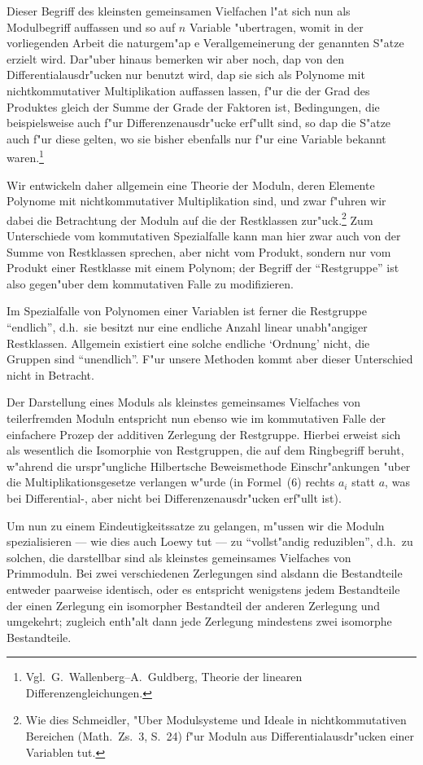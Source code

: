 \documentclass[12pt,a4paper]{article}
\begin{document}
Dieser Begriff des kleinsten gemeinsamen Vielfachen l"at sich nun als Modulbegriff auffassen und so auf $n$ Variable "ubertragen, womit in der vorliegenden Arbeit die naturgem"ap e Verallgemeinerung der genannten S"atze erzielt wird. Dar"uber hinaus bemerken wir aber noch, dap von den Differentialausdr"ucken nur benutzt wird, dap sie sich als Polynome mit nichtkommutativer Multiplikation auffassen lassen, f"ur die der Grad des Produktes gleich der Summe der Grade der Faktoren ist, Bedingungen, die beispielsweise auch f"ur Differenzenausdr"ucke erf"ullt sind, so dap die S"atze auch f"ur diese gelten, wo sie bisher ebenfalls nur f"ur eine Variable bekannt waren.\footnote{Vgl.\ G.\ Wallenberg--A.\ Guldberg, Theorie der linearen Differenzengleichungen.}

Wir entwickeln daher allgemein eine Theorie der Moduln, deren Elemente Polynome mit nichtkommutativer Multiplikation sind, und zwar f"uhren wir dabei die Betrachtung der Moduln auf die der Restklassen zur"uck.\footnote{Wie dies Schmeidler, "Uber Modulsysteme und Ideale in nichtkommutativen Bereichen (Math.\ Zs.\ 3, S.~24) f"ur Moduln aus Differentialausdr"ucken einer Variablen tut.} Zum Unterschiede vom kommutativen Spezialfalle kann man hier zwar auch von der Summe von Restklassen sprechen, aber nicht vom Produkt, sondern nur vom Produkt einer Restklasse mit einem Polynom; der Begriff der ``Restgruppe'' ist also gegen"uber dem kommutativen Falle zu modifizieren.

Im Spezialfalle von Polynomen einer Variablen ist ferner die Restgruppe ``endlich'', d.h.\ sie besitzt nur eine endliche Anzahl linear unabh"angiger Restklassen. Allgemein existiert eine solche endliche `Ordnung' nicht, die Gruppen sind ``unendlich''. F"ur unsere Methoden kommt aber dieser Unterschied nicht in Betracht.

Der Darstellung eines Moduls als kleinstes gemeinsames Vielfaches von teilerfremden Moduln entspricht nun ebenso wie im kommutativen Falle der einfachere Prozep der additiven Zerlegung der Restgruppe. Hierbei erweist sich als wesentlich die Isomorphie von Restgruppen, die auf dem Ringbegriff beruht, w"ahrend die urspr"ungliche Hilbertsche Beweismethode Einschr"ankungen "uber die Multiplikationsgesetze verlangen w"urde (in Formel~(6) rechts $a_i$ statt $a$, was bei Differential-, aber nicht bei Differenzenausdr"ucken erf"ullt ist).

Um nun zu einem Eindeutigkeitssatze zu gelangen, m"ussen wir die Moduln spezialisieren --- wie dies auch Loewy tut --- zu ``vollst"andig reduziblen'', d.h.\ zu solchen, die darstellbar sind als kleinstes gemeinsames Vielfaches von Primmoduln. Bei zwei verschiedenen Zerlegungen sind alsdann die Bestandteile entweder paarweise identisch, oder es entspricht wenigstens jedem Bestandteile der einen Zerlegung ein isomorpher Bestandteil der anderen Zerlegung und umgekehrt; zugleich enth"alt dann jede Zerlegung mindestens zwei isomorphe Bestandteile.
\end{document}
